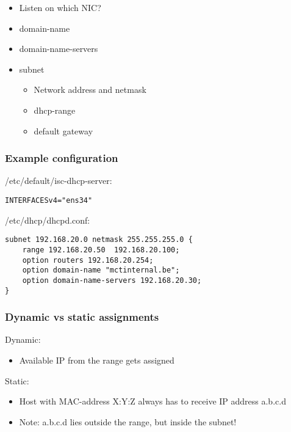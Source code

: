 \documentclass{article}
\begin{document}
\begin{itemize}
    \item Listen on which NIC?
    \item domain-name
    \item domain-name-servers
    \item subnet
    \begin{itemize}
        \item Network address and netmask
        \item dhcp-range
        \item default gateway
    \end{itemize}
\end{itemize}

\subsubsection{Example configuration}

/etc/default/isc-dhcp-server:

\begin{verbatim}
INTERFACESv4="ens34"
\end{verbatim}

/etc/dhcp/dhcpd.conf:

\begin{verbatim}
subnet 192.168.20.0 netmask 255.255.255.0 {
    range 192.168.20.50  192.168.20.100;
    option routers 192.168.20.254;
    option domain-name "mctinternal.be";
    option domain-name-servers 192.168.20.30;
}
\end{verbatim}

\subsubsection{Dynamic vs static assignments}

Dynamic:

\begin{itemize}
    \item Available IP from the range gets assigned
\end{itemize}

Static:

\begin{itemize}
    \item Host with MAC-address X:Y:Z always has to receive IP address a.b.c.d
    \item Note: a.b.c.d lies outside the range, but inside the subnet!
\end{itemize}
\end{document}
